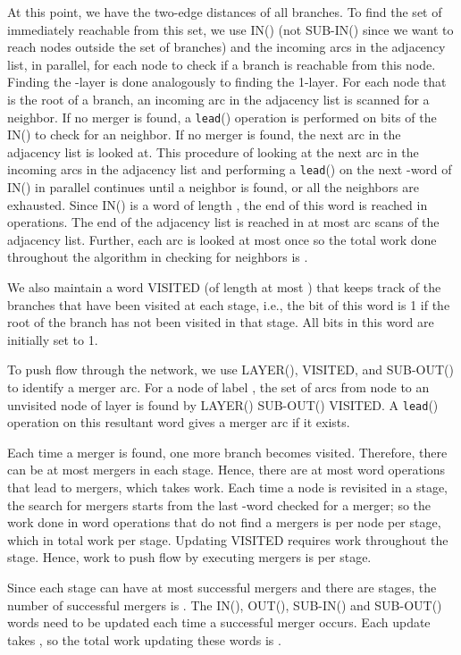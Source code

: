 \documentclass{article}
\begin{document}
At this point, we have the two-edge distances of all  branches.
To find the set of  immediately reachable from this set, we use
IN() (not SUB-IN() since we want to reach nodes outside the set of
 branches) and the incoming arcs in the adjacency list, in
parallel, for each node to check if a  branch is reachable from
this node. Finding the -layer is done analogously to finding the
1-layer. For each node  that is the root of a  branch, an
incoming arc in the adjacency list is scanned for a  neighbor. If
no merger is found, a {\tt lead}() operation is performed on 
bits of the IN() to check for an  neighbor. If no merger
is found, the next arc in the adjacency list is looked at. This
procedure of looking at the next arc in the incoming arcs in the
adjacency list and performing a {\tt lead}() on the next -word
of IN() in parallel continues until a  neighbor is found, or
all the neighbors are exhausted. Since IN() is a word of length
, the end of this word is reached in  operations.
The end of the adjacency list is reached in at most  arc scans
of the adjacency list. Further, each arc is looked at most once so the
total work done throughout the algorithm in checking for 
neighbors is .

We also maintain a word VISITED (of length at most ) that keeps track of the branches that have been visited at each stage, i.e., the  bit of this word is 1 if the root of the branch has {not} been visited in that stage. All bits in this word are initially set to 1.

To push flow through the network, we use LAYER(), VISITED, and SUB-OUT() to identify a merger arc. For a node  of label , the set of arcs from node  to an unvisited node of layer  is found by LAYER()  SUB-OUT()  VISITED. A {\tt lead}() operation on this resultant word gives a merger arc if it exists.

Each time a merger is found, one more branch becomes visited. Therefore, there can be at most  mergers in each stage. Hence, there are at most  word operations that lead to mergers, which takes  work. Each time a node is revisited in a stage, the search for mergers starts from the last -word checked for a merger; so the work done in word operations that do not find a mergers is  per node per stage, which in  total work per stage.  Updating VISITED requires  work throughout the stage. Hence, work to push flow by executing mergers is  per stage.

Since each stage can have at most  successful mergers and there are  stages, the number of successful mergers is . The IN(), OUT(), SUB-IN() and SUB-OUT() words need to be updated each time a successful merger occurs. Each update takes , so the total work updating these words is .
\end{document}
